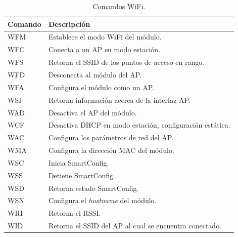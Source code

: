 \documentclass[a4paper,spanish,11pt]{article}
\begin{document}
\begin{table}[H]
	\centering
	\renewcommand\arraystretch{1.5}
	\begin{tabular}{@{} ll @{}}
		\toprule
		\textbf{Comando} & \textbf{Descripción} \\ 
		\midrule
		WFM & Establece el modo WiFi del módulo.\\
		WFC & Conecta a un AP en modo estación.\\ 
		WFS & Retorna el SSID de los puntos de acceso en rango. \\ 
		WFD & Desconecta al módulo del AP.\\
		WFA & Configura el módulo como un AP.\\
		WSI & Retorna información acerca de la interfaz AP. \\
		WAD & Desactiva el AP del módulo. \\ 
		WCF & Desactiva DHCP en modo estación, configuración estática. \\
		WAC & Configura los parámetros de red del AP. \\
		WMA & Configura la dirección MAC del módulo.\\
		WSC & Inicia SmartConfig. \\
		WSS & Detiene SmartConfig. \\ 
		WSD & Retorna estado SmartConfig. \\ 
		WSN & Configura el \textit{hostname} del módulo. \\
		WRI & Retorna el RSSI. \\
		WID & Retorna el SSID del AP al cual se encuentra conectado. \\ 
		\bottomrule
	\end{tabular}
	\caption{Comandos WiFi.}
	\label{tab:comandos_wifi}
\end{table}
\end{document}
